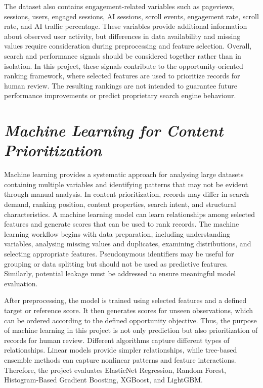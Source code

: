 \documentclass[12pt,a4paper]{report}
\begin{document}
The dataset also contains engagement-related variables such as pageviews, sessions, users, engaged sessions, AI sessions, scroll events, engagement rate, scroll rate, and AI traffic percentage. These variables provide additional information about observed user activity, but differences in data availability and missing values require consideration during preprocessing and feature selection. Overall, search and performance signals should be considered together rather than in isolation. In this project, these signals contribute to the opportunity-oriented ranking framework, where selected features are used to prioritize records for human review. The resulting rankings are not intended to guarantee future performance improvements or predict proprietary search engine behaviour.

\section{\textit{Machine Learning for Content Prioritization}}
Machine learning provides a systematic approach for analysing large datasets containing multiple variables and identifying patterns that may not be evident through manual analysis. In content prioritization, records may differ in search demand, ranking position, content properties, search intent, and structural characteristics. A machine learning model can learn relationships among selected features and generate scores that can be used to rank records. The machine learning workflow begins with data preparation, including understanding variables, analysing missing values and duplicates, examining distributions, and selecting appropriate features. Pseudonymous identifiers may be useful for grouping or data splitting but should not be used as predictive features. Similarly, potential leakage must be addressed to ensure meaningful model evaluation.

After preprocessing, the model is trained using selected features and a defined target or reference score. It then generates scores for unseen observations, which can be ordered according to the defined opportunity objective. Thus, the purpose of machine learning in this project is not only prediction but also prioritization of records for human review. Different algorithms capture different types of relationships. Linear models provide simpler relationships, while tree-based ensemble methods can capture nonlinear patterns and feature interactions. Therefore, the project evaluates ElasticNet Regression, Random Forest, Histogram-Based Gradient Boosting, XGBoost, and LightGBM.
\end{document}
